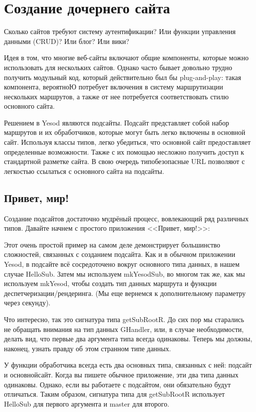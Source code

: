 \chapter{Создание дочернего сайта}\label{chap:subsite}

Сколько сайтов требуют систему аутентификации? Или функции управления данными (CRUD)? Или блог? Или вики?

Идея в том, что многие веб-сайты включают общие компоненты, которые можно использовать для нескольких сайтов. Однако часто бывает довольно трудно получить модульный код, который действительно был бы plug-and-play: такая компонента, вероятноЮ потребует включения в систему маршрутизации нескольких маршрутов, а также от нее потребуется соответствовать стилю основного сайта.

Решением в Yesod являются подсайты. Подсайт представляет собой набор маршрутов и их обработчиков, которые могут быть легко включены в основной сайт. Используя классы типов, легко убедиться, что основной сайт предоставляет определенные возможности. Также с их помощью несложно получить доступ к стандартной разметке сайта. В свою очередь типобезопасные URL позволяют с легкостью ссылаться с основного сайта на подсайты.

\section{Привет, мир!}

Создание подсайтов достаточно мудрёный процесс, вовлекающий ряд различных типов. Давайте начнем с простого приложения <<Привет, мир!>>:

Этот очень простой пример на самом деле демонстрирует большинство сложностей, связанных с созданием подсайта. Как и в обычном приложении Yesod, в подсайте всё сосредоточено вокруг основного типа данных, в нашем случае HelloSub. Затем мы используем mkYesodSub, во многом так же, как мы используем mkYesod, чтобы создать тип данных маршрута и функции деспетчеризации/рендеринга. (Мы еще вернемся к дополнительному параметру через секунду).

Что интересно, так это сигнатура типа getSubRootR. До сих пор мы старались не обращать внимания на тип данных GHandler, или, в случае необходимости, делать вид, что первые два аргумента типа всегда одинаковы. Теперь мы должны, наконец, узнать правду об этом странном типе данных.

У функции обработчика всегда есть два основных типа, связанных с ней: подсайт и основнойсайт. Когда вы пишете обычное приложение, эти два типа данных одинаковы.  Однако, если вы работаете с подсайтом, они обязательно будут отличаться. Таким образом, сигнатура типа для getSubRootR использует HelloSub для первого аргумента и master для второго.

